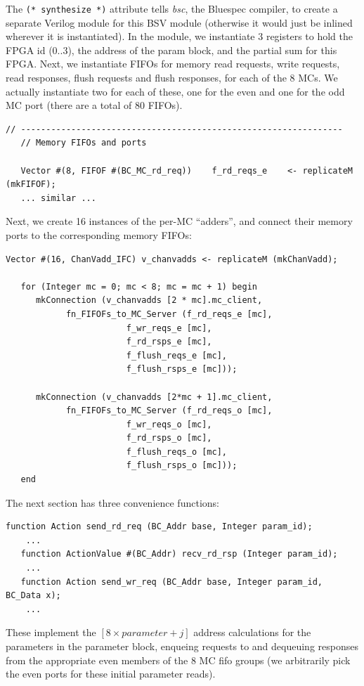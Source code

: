 \documentclass[twoside,letterpaper,11pt]{article}
\begin{document}
The \verb|(* synthesize *)| attribute tells \emph{bsc}, the Bluespec
compiler, to create a separate Verilog module for this BSV module
(otherwise it would just be inlined wherever it is instantiated).  In
the module, we instantiate 3 registers to hold the FPGA id (0..3), the
address of the param block, and the partial sum for this FPGA.  Next,
we instantiate FIFOs for memory read requests, write requests, read
responses, flush requests and flush responses, for each of the 8 MCs.
We actually instantiate two for each of these, one for the even and
one for the odd MC port (there are a total of 80 FIFOs).
\begin{Verbatim}[frame=single, label=App\_HW\_v0.bsv] 
   // ----------------------------------------------------------------
   // Memory FIFOs and ports

   Vector #(8, FIFOF #(BC_MC_rd_req))    f_rd_reqs_e    <- replicateM (mkFIFOF);
   ... similar ...
\end{Verbatim}

Next, we create 16 instances of the per-MC ``adders'', and connect
their memory ports to the corresponding memory FIFOs:

\begin{Verbatim}[frame=single, label=App\_HW\_v0.bsv] 
   Vector #(16, ChanVadd_IFC) v_chanvadds <- replicateM (mkChanVadd);

   for (Integer mc = 0; mc < 8; mc = mc + 1) begin
      mkConnection (v_chanvadds [2 * mc].mc_client,
		    fn_FIFOFs_to_MC_Server (f_rd_reqs_e [mc],
					    f_wr_reqs_e [mc],
					    f_rd_rsps_e [mc],
					    f_flush_reqs_e [mc],
					    f_flush_rsps_e [mc]));

      mkConnection (v_chanvadds [2*mc + 1].mc_client,
		    fn_FIFOFs_to_MC_Server (f_rd_reqs_o [mc],
					    f_wr_reqs_o [mc],
					    f_rd_rsps_o [mc],
					    f_flush_reqs_o [mc],
					    f_flush_rsps_o [mc]));
   end
\end{Verbatim}
The next section has three convenience functions:
\begin{Verbatim}[frame=single, label=App\_HW\_v0.bsv] 
   function Action send_rd_req (BC_Addr base, Integer param_id);
    ...
   function ActionValue #(BC_Addr) recv_rd_rsp (Integer param_id);
    ...
   function Action send_wr_req (BC_Addr base, Integer param_id, BC_Data x);
    ...
\end{Verbatim}

These implement the $[8 \times parameter + j]$ address calculations
for the parameters in the parameter block, enqueing requests to and
dequeuing responses from the appropriate even members of the 8 MC fifo
groups (we arbitrarily pick the even ports for these initial parameter
reads).
\end{document}
